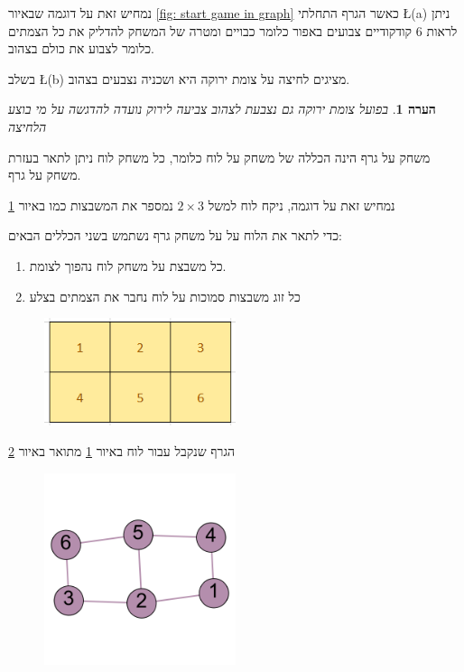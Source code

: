 \documentclass[12pt,twoside]{article}
\newtheorem{comm}{הערה}[section]
\begin{document}
נמחיש זאת על דוגמה שבאיור
\ref{fig: start game in graph}
כאשר הגרף התחלתי
\L{(a)}
ניתן לראות
$6$
קודקודיים
צבועים באפור כלומר כבויים ומטרה של המשחק להדליק את כל הצמתים כלומר לצבוע את כולם בצהוב.

בשלב 
\L{(b)}
מציגים  לחיצה על צומת ירוקה היא ושכניה נצבעים בצהוב.

\begin{comm}
    בפועל צומת ירוקה גם נצבעת לצהוב צביעה לירוק נועדה להדגשה על מי בוצע הלחיצה
\end{comm}

משחק על גרף הינה הכללה  של משחק על לוח כלומר, כל משחק 
לוח ניתן לתאר בעזרת משחק על גרף.

נמחיש זאת על דוגמה, ניקח לוח למשל
$2 \times 3$
נמספר את המשבצות כמו באיור
\ref{2x3_board}

כדי לתאר את הלוח על על משחק גרף נשתמש בשני הכללים הבאים:
\begin{enumerate}
    \item 
    כל משבצת על משחק לוח נהפוך לצומת.
    \item 
    כל זוג משבצות סמוכות על לוח נחבר את הצמתים בצלע
\end{enumerate}

\begin{figure}[ht]
    \caption{
    }
    \label{2x3_board}
    \unsethebrew
    \centering
    \includegraphics[width=0.5\textwidth,height=0.5\textheight,keepaspectratio]{images/2x3_board.PNG}
    \sethebrew
\end{figure}

הגרף שנקבל עבור לוח באיור
\ref{2x3_board}
מתואר באיור
\ref{2x3_graph}

\begin{figure}[ht]
    \caption{
    }
    \unsethebrew
    \centering
    \label{2x3_graph}
    \includegraphics[width=0.5\textwidth,height=0.5\textheight,keepaspectratio]{images/2x3_graph.png}
    \sethebrew
\end{figure}
\end{document}
